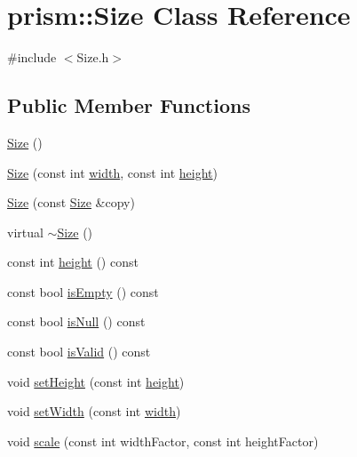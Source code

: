 \hypertarget{classprism_1_1_size}{}\section{prism\+:\+:Size Class Reference}
\label{classprism_1_1_size}


{\ttfamily \#include $<$Size.\+h$>$}

\subsection*{Public Member Functions}
\begin{DoxyCompactItemize}
\item 
\hyperlink{classprism_1_1_size_a61acf22a770bbca569b56d860bb95d0b}{Size} ()
\item 
\hyperlink{classprism_1_1_size_a115a8c5c7fcd709f2eaaff6e7a6c833a}{Size} (const int \hyperlink{classprism_1_1_size_a596f8cbdf0baa999e9652c702d58f0f3}{width}, const int \hyperlink{classprism_1_1_size_a1be5292609e9061f9637edc0d436e7eb}{height})
\item 
\hyperlink{classprism_1_1_size_a3eea778ebcf91dab6b8723fc5b7695e8}{Size} (const \hyperlink{classprism_1_1_size}{Size} \&copy)
\item 
virtual \hyperlink{classprism_1_1_size_ae29d928a0c3761b3d97d6f92b93676d7}{$\sim$\+Size} ()
\item 
const int \hyperlink{classprism_1_1_size_a1be5292609e9061f9637edc0d436e7eb}{height} () const 
\item 
const bool \hyperlink{classprism_1_1_size_a3a0aeaee6472ff145b6f308804f7c3a9}{is\+Empty} () const 
\item 
const bool \hyperlink{classprism_1_1_size_a1a10e8d131a5af7343f09749d01d5312}{is\+Null} () const 
\item 
const bool \hyperlink{classprism_1_1_size_a43047aee2065808f7cd43c6c4c717ceb}{is\+Valid} () const 
\item 
void \hyperlink{classprism_1_1_size_ab35fc21d1dfe330b8b589b1afb92de14}{set\+Height} (const int \hyperlink{classprism_1_1_size_a1be5292609e9061f9637edc0d436e7eb}{height})
\item 
void \hyperlink{classprism_1_1_size_a52a5e068c0346e6fcabe7002eb84ff7b}{set\+Width} (const int \hyperlink{classprism_1_1_size_a596f8cbdf0baa999e9652c702d58f0f3}{width})
\item 
void \hyperlink{classprism_1_1_size_ab97f1b2b8d01ef85ad106590b7a359b7}{scale} (const int width\+Factor, const int height\+Factor)
\item 

\end{DoxyCompactItemize}
